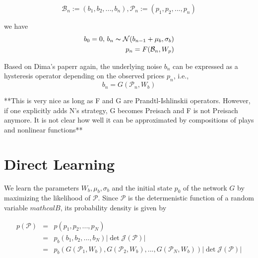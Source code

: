 \documentclass[11pt]{article}
\begin{document}
\[\mathcal{B}_n := (b_1, b_2, ..., b_n), \mathcal{P}_n := (p_1, p_2, ..., p_n)\]

we have
\begin{eqnarray}
b_{0} = 0, \, b_{n} \thicksim \mathcal{N} (b_{n-1} + \mu_{b}, \sigma_{b}) \\
p_{n} = F(\mathcal{B}_n, W_{p})
\end{eqnarray}


Based on Dima's paperr again, the underlying noise \(b_n\) can be expressed as a hysteresis operator depending on
the observed prices \(p_n\), i.e.,
\[b_n=G(\mathcal{P}_n, W_b)\]


**This is very nice as long as F and G are Prandtl-Ishlinskii operators. However, if one explicitly adds N's strategy,
G becomes Preisach and F is not Preisach anymore. It is not clear how well it can be approximated by compositions of
plays and nonlinear functions**


\section{Direct Learning}
\label{sec:org0464e23}
We learn the parameters \(W_b, \mu_b, \sigma_b\) and the initial state \(p_0\) of the network \(G\) by maximizing
the likelihood of \(\mathcal{P}\). Since \(\mathcal{P}\) is the determenistic function of a random variable
\(mathcal{B}\), its probability density is given by

\begin{eqnarray}
p(\mathcal{P}) &=& p(p_1, p_2, ..., p_N) \\
               &=& p_b(b_1, b_2, ..., b_N) \left|\det \mathcal{J(P)}\right| \\
               &=& p_b(G(\mathcal{P}_1, W_b), G(\mathcal{P}_2, W_b), ..., G(\mathcal{P}_N, W_b)) \left|\det \mathcal{J(P)}\right| \\
\end{eqnarray}
\end{document}
